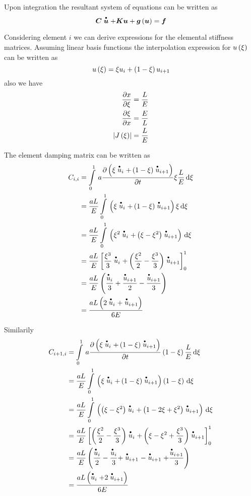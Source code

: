 Upon integration the resultant system of equations can be written as
\begin{equation}
  \matr{C}\dotover{\vectr{u}}+\matr{K}\vectr{u}+\fnof{\vectr{g}}{\vectr{u}}=\vectr{f}
\end{equation}

Considering element $i$ we can derive expressions for the elemental
stiffness matrices. Assuming linear basis functions the interpolation
expression for $ u\left( \xi \right) $ can be written as
\begin{equation}
   u\left( \xi \right) =\xi u_{i}+\left( 1-\xi \right)u_{i+1}
\end{equation}
also we have
\begin{align}
   \dfrac{\partial x}{\partial \xi} &=\dfrac{L}{E} \\
   \dfrac{\partial \xi}{\partial x} &=\dfrac{E}{L} \\
  \left|  J\left( \xi \right)  \right|&=\dfrac{L}{E}
\end{align}

The element damping matrix can be written as
\begin{align}
  C_{i,i}&=\gint{0}{1}{a\delby{\pbrac{\xi \dotover{u}_{i}+\pbrac{1-\xi}\dotover{u}_{i+1}}}{t}\xi\dfrac{L}{E}}{\xi} \\
  &=\dfrac{aL}{E}\gint{0}{1}{\pbrac{\xi\dotover{u}_{i}+\pbrac{1-\xi}\dotover{u}_{i+1}}\xi}{\xi} \\
  &=\dfrac{aL}{E}\gint{0}{1}{\pbrac{\xi^{2}\dotover{u}_{i}+\pbrac{\xi-\xi^{2}}\dotover{u}_{i+1}}}{\xi} \\
  &=\dfrac{aL}{E}\sqbrac{\dfrac{\xi^{3}}{3}\dotover{u}_{i}+\pbrac{\dfrac{\xi^{2}}{2}-\dfrac{\xi^{3}}{3}}\dotover{u}_{i+1}}_{0}^{1}\\
  &=\dfrac{aL}{E}\pbrac{\dfrac{\dotover{u}_{i}}{3}+\dfrac{\dotover{u}_{i+1}}{2}-\dfrac{\dotover{u}_{i+1}}{3}}\\
  &=\dfrac{aL\pbrac{2\dotover{u}_{i}+\dotover{u}_{i+1}}}{6E}  
\end{align}

Similarily
\begin{align}
  C_{i+1,i}&=\gint{0}{1}{a\delby{\pbrac{\xi \dotover{u}_{i}+\pbrac{1-\xi}\dotover{u}_{i+1}}}{t}\pbrac{1-\xi}\dfrac{L}{E}}{\xi} \\
  &=\dfrac{aL}{E}\gint{0}{1}{\pbrac{\xi\dotover{u}_{i}+\pbrac{1-\xi}\dotover{u}_{i+1}}\pbrac{1-\xi}}{\xi} \\
  &=\dfrac{aL}{E}\gint{0}{1}{\pbrac{\pbrac{\xi-\xi^{2}}\dotover{u}_{i}+\pbrac{1-2\xi+\xi^{2}}\dotover{u}_{i+1}}}{\xi} \\
  &=\dfrac{aL}{E}\sqbrac{\pbrac{\dfrac{\xi^{2}}{2}-\dfrac{\xi^{3}}{3}}\dotover{u}_{i}+\pbrac{\xi-\xi^{2}+
      \dfrac{\xi^{3}}{3}}\dotover{u}_{i+1}}_{0}^{1}\\
  &=\dfrac{aL}{E}\pbrac{\dfrac{\dotover{u}_{i}}{2}-\dfrac{\dotover{u}_{i}}{3}+\dotover{u}_{i+1}-\dotover{u}_{i+1}+
    \dfrac{\dotover{u}_{i+1}}{3}}\\
  &=\dfrac{aL\pbrac{\dotover{u}_{i}+2\dotover{u}_{i+1}}}{6E}  
\end{align}

